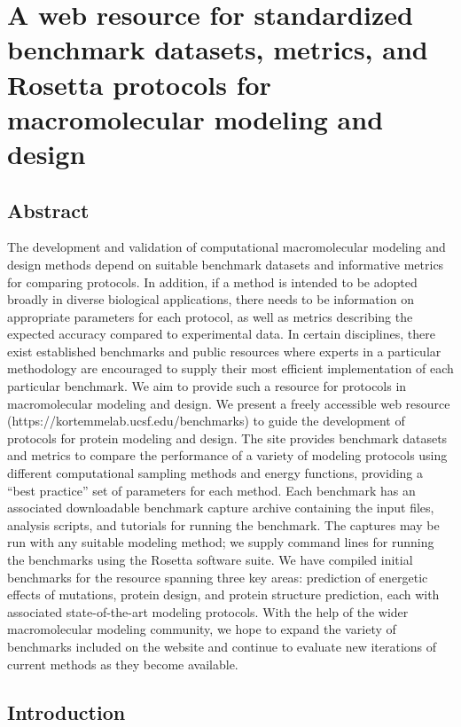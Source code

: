 \chapter{A web resource for standardized benchmark datasets, metrics, and Rosetta protocols for macromolecular modeling and design}
\label{chapter:web-benchmark}


\section{Abstract}

The development and validation of computational macromolecular modeling and design methods depend on suitable benchmark datasets and informative metrics for comparing protocols. In addition, if a method is intended to be adopted broadly in diverse biological applications, there needs to be information on appropriate parameters for each protocol, as well as metrics describing the expected accuracy compared to experimental data. In certain disciplines, there exist established benchmarks and public resources where experts in a particular methodology are encouraged to supply their most efficient implementation of each particular benchmark. We aim to provide such a resource for protocols in macromolecular modeling and design. We present a freely accessible web resource (https://kortemmelab.ucsf.edu/benchmarks) to guide the development of protocols for protein modeling and design. The site provides benchmark datasets and metrics to compare the performance of a variety of modeling protocols using different computational sampling methods and energy functions, providing a ``best practice'' set of parameters for each method. Each benchmark has an associated downloadable benchmark capture archive containing the input files, analysis scripts, and tutorials for running the benchmark. The captures may be run with any suitable modeling method; we supply command lines for running the benchmarks using the Rosetta software suite. We have compiled initial benchmarks for the resource spanning three key areas: prediction of energetic effects of mutations, protein design, and protein structure prediction, each with associated state-of-the-art modeling protocols. With the help of the wider macromolecular modeling community, we hope to expand the variety of benchmarks included on the website and continue to evaluate new iterations of current methods as they become available.

\section{Introduction}

